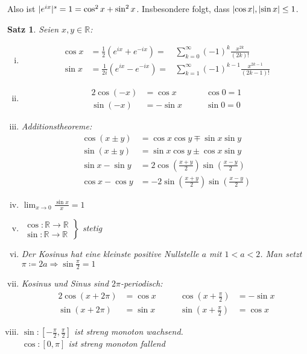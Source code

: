 \documentclass[ngerman,titlepage,twoside, parskip=half*]{scrreprt}
\newcommand*{\R}{\mathbb{R}}
\theoremstyle{break}
\newtheorem{theorem}{Satz}[section]
\theoremstyle{nonumberbreak}
\DeclarePairedDelimiter{\abs}{\lvert}{\rvert}
\begin{document}
Also ist $\abs{e^{ix}}^s=1=\cos^2 x+\sin^2 x$. Insbesondere folgt, dass $\abs{\cos x}, \abs{\sin x}\leq 1$.

\begin{theorem}
Seien $x,y\in\R$:
\begin{enumerate}[(i)]
  \item \begin{align*}
    \cos x & = \frac{1}{2}(e^{ix}+e^{-ix}) =  &\sum_{k=0}^\infty (-1)^k \frac{x^{2k}}{(2k)!}\\
    \sin x & = \frac{1}{2i}(e^{ix}-e^{-ix}) =  &\sum_{k=1}^\infty (-1)^{k-1}\frac{x^{2k-1}}{(2k-1)!}
  \end{align*}
  \item \begin{alignat*}{2}
    \cos (-x) & = \cos x & \qquad \cos 0 = 1\\
    \sin (-x) & = -\sin x & \qquad \sin 0 =0
  \end{alignat*}
  \item Additionstheoreme:
  \begin{align*}
    \cos (x\pm y) & = \cos x \cos y \mp \sin x \sin y\\
    \sin (x\pm y) & = \sin x \cos y \pm \cos x \sin y\\
    \sin x - \sin y & = 2\cos (\frac{x+y}{2})\sin (\frac{x-y}{2})\\
    \cos x - \cos y & = -2\sin (\frac{x+y}{2})\sin(\frac{x-y}{2})
  \end{align*}
  \item $\lim_{x\rightarrow 0} \frac{\sin x}{x}=1$
  \item $\left.\begin{array}{rcl}
    \cos \colon\R\rightarrow\R\\
    \sin \colon \R\rightarrow\R\end{array}\right\}$ stetig
  \item Der Kosinus hat eine kleinste positive Nullstelle $a$ mit $1<a<2$. Man setzt $\pi\coloneqq2a\Rightarrow
    \sin \frac{\pi}{2}=1$
  \item Kosinus und Sinus sind $2\pi$-periodisch:
    \begin{alignat*}{2}
      \cos (x+2\pi) & = \cos x & \qquad \cos (x+\frac{\pi}{2}) & = -\sin x\\
      \sin (x+2\pi) & = \sin x & \qquad \sin (x+\frac{\pi}{2}) & = \cos x
    \end{alignat*}
  \item $\sin \colon [-\frac{\pi}{2},\frac{\pi}{2}]$ ist streng monoton wachsend.\\
    $\cos \colon [0,\pi]$ ist streng monoton fallend
\end{enumerate}
\end{theorem}
\end{document}

